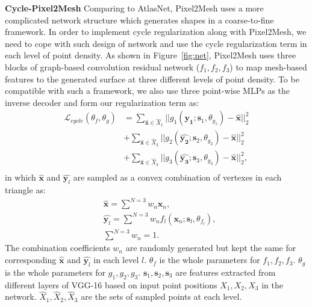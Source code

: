 \noindent\textbf{Cycle-Pixel2Mesh}
Comparing to AtlasNet, Pixel2Mesh uses a more complicated network structure which generates shapes in a coarse-to-fine framework. In order to implement cycle regularization along with Pixel2Mesh, we need to cope with such design of network and use the cycle regularization term in each level of point density.
As shown in Figure~\ref{fig:net}, Pixel2Mesh uses three blocks of graph-based convolution residual network ($f_1,f_2,f_3$) to map mesh-based features to the generated surface at three different levels of point density. To be compatible with such a framework, we also use three point-wise MLPs as the inverse decoder and form our regularization term as:
\begin{equation}
\begin{aligned}
\mathcal{L}_{cycle}(\theta_f,\theta_g) 
&= \sum_{\hat{\mathbf{x}} \in \hat{X}_1}||g_{1}(\hat{\mathbf{y_1}};\mathbf{s}_1,\theta_{g_1}) - \hat{\mathbf{x}}||_2^2\\
&+ \sum_{\hat{\mathbf{x}} \in \hat{X}_2}||g_{2}(\hat{\mathbf{y_2}};\mathbf{s}_2,\theta_{g_2}) - \hat{\mathbf{x}}||_2^2\\
&+ \sum_{\hat{\mathbf{x}} \in \hat{X}_3}||g_{3}(\hat{\mathbf{y_3}};\mathbf{s}_3,\theta_{g_3}) - \hat{\mathbf{x}}||_2^2,\\
\end{aligned}
\end{equation}
in which $\hat{\mathbf{x}}$ and $\hat{\mathbf{y}_l}$ are sampled as a convex combination of vertexes in each triangle as:
\begin{equation}
\begin{aligned}
\label{equ:sample}
&\hat{\mathbf{x}} = \sum^{N=3} w_n\mathbf{x}_n, \\
&\hat{\mathbf{y}_l} = \sum^{N=3} w_nf_l(\mathbf{x}_n;\mathbf{s}_l,\theta_{f_l}),\\
&\sum^{N=3} w_n = 1.
\end{aligned}
\end{equation}
The combination coefficients $w_n$ are randomly generated but kept the same for corresponding $\hat{\mathbf{x}}$ and $\hat{\mathbf{y}_l}$ in each level $l$. $\theta_f$ is the whole parameters for $f_1,f_2,f_3$. $\theta_g$ is the whole parameters for $g_1,g_2,g_3$. $\mathbf{s}_1,\mathbf{s}_2,\mathbf{s}_3$ are features extracted from different layers of VGG-16 based on input point positions $X_1,X_2,X_3$ in the network. $\hat{X}_1,\hat{X}_2,\hat{X}_3$ are the sets of sampled points at each level.
